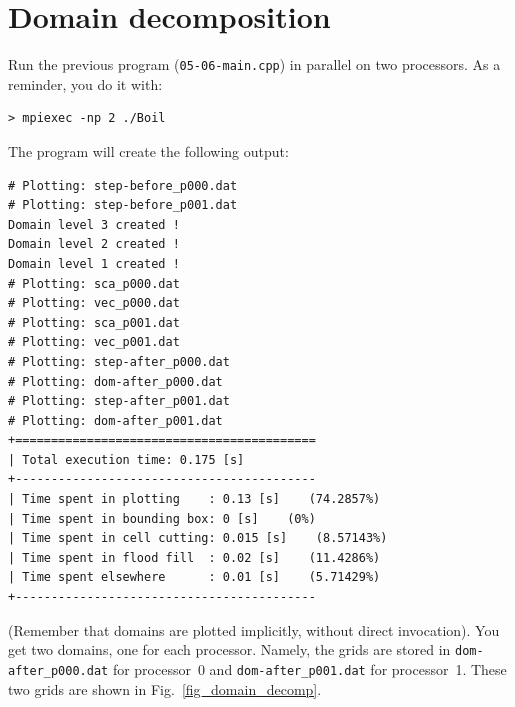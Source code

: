 \section{Domain decomposition}
\label{sec_decomposition}

Run the previous program ({\tt 05-06-main.cpp}) in parallel on two processors. 
As a reminder, you do it with:
%
\begin{verbatim}
> mpiexec -np 2 ./Boil
\end{verbatim}
%
The program will create the following output:
%
{\small \begin{verbatim}
# Plotting: step-before_p000.dat
# Plotting: step-before_p001.dat
Domain level 3 created !
Domain level 2 created !
Domain level 1 created !
# Plotting: sca_p000.dat
# Plotting: vec_p000.dat
# Plotting: sca_p001.dat
# Plotting: vec_p001.dat
# Plotting: step-after_p000.dat
# Plotting: dom-after_p000.dat
# Plotting: step-after_p001.dat
# Plotting: dom-after_p001.dat
+==========================================
| Total execution time: 0.175 [s]
+------------------------------------------
| Time spent in plotting    : 0.13 [s]    (74.2857%)
| Time spent in bounding box: 0 [s]    (0%)
| Time spent in cell cutting: 0.015 [s]    (8.57143%)
| Time spent in flood fill  : 0.02 [s]    (11.4286%)
| Time spent elsewhere      : 0.01 [s]    (5.71429%)
+------------------------------------------
\end{verbatim}}
%
(Remember that domains are plotted implicitly, without direct invocation).
You get two domains, one for each processor. Namely, the grids are stored
in {\tt dom-after\_p000.dat} for processor~0 and {\tt dom-after\_p001.dat}
for processor~1. These two grids are shown in Fig.~\ref{fig_domain_decomp}.

